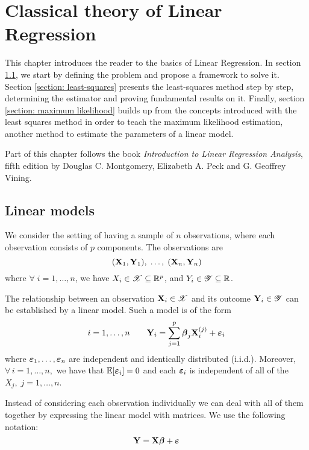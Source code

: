 \chapter{Classical theory of Linear Regression}
\label{chapter: classical theory of linear regression}

This chapter introduces the reader to the basics of Linear Regression. In section \ref{section: linear models}, we start by defining the problem and propose a framework to solve it. Section \ref{section: least-squares} presents the least-squares method step by step, determining the estimator and proving fundamental results on it. Finally, section \ref{section: maximum likelihood} builds up from the concepts introduced with the least squares method in order to teach the maximum likelihood estimation, another method to estimate the parameters of a linear model.

Part of this chapter follows the book \textit{Introduction to Linear Regression Analysis}, fifth edition by Douglas C. Montgomery, Elizabeth A. Peck and G. Geoffrey Vining.

\section{Linear models}
\label{section: linear models}

We consider the setting of having a sample of $n$ observations, where each observation consists of \(p\) components. The observations are
\[
    (\mathbf{X}_1, \mathbf{Y}_1), \; \ldots , \;(\mathbf{X}_n, \mathbf{Y}_n)
\]
where \(\forall \; i = 1, \ldots, n\), we have \(X_i \in \mathscr{X} \subseteq \mathbb{R}^p\), and \(Y_i \in \mathscr{Y} \subseteq \mathbb{R}\).

\begin{definition}
    The relationship between an observation $\mathbf{X}_i \in \mathscr{X}$ and its outcome $\mathbf{Y}_i \in \mathscr{Y}$ can be established by a linear model. Such a model is of the form
    \begin{equation}
        i = 1, \ldots, n \qquad \mathbf{Y}_{i} = \sum_{j=1}^{p} \boldsymbol{\beta}_{j} \mathbf{X}_{i}^{(j)} + \boldsymbol{\varepsilon}_{i}
    \end{equation}
    where \(\boldsymbol{\varepsilon}_1, \ldots, \boldsymbol{\varepsilon}_n\) are independent and identically distributed (i.i.d.). Moreover, \(\forall \, i = 1, \ldots, n, \) we have that \( \mathbb{E} [\boldsymbol{\varepsilon}_i] = 0\) and each \(\boldsymbol{\varepsilon}_i\) is independent of all of the \( X_j, \; j=1, \ldots, n \).
\end{definition}
Instead of considering each observation individually we can deal with all of them together by expressing the linear model with matrices. We use the following notation:
\begin{equation}
    \label{eqn: linear model (matrix)}
    \mathbf{Y} = \mathbf{X} \boldsymbol{\beta} + \boldsymbol{\varepsilon}
\end{equation}

